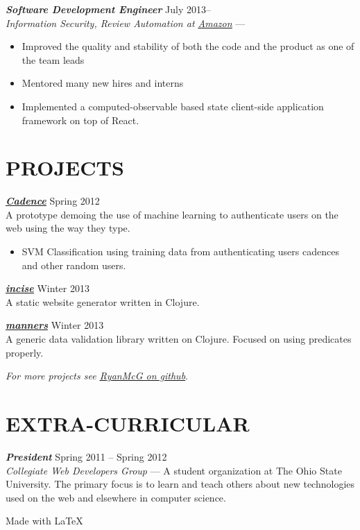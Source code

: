 \documentclass[line,letterpaper]{resume}
\begin{document}
\begin{resume}
    {\sl\textbf{Software Development Engineer}} \hfill July 2013--\\
    \emph{Information Security, Review Automation at
    \underline{\href{http://www.amazon.com/}{Amazon}}} ---
    \begin{itemize}
        \item Improved the quality and stability of both the code and the
            product as one of the team leads
        \item Mentored many new hires and interns
        \item Implemented
            a computed-observable based state client-side application framework on top
            of React.
    \end{itemize}
    \vspace{-6pt}


    \section{\uppercase{Projects}}
    {\sl\textbf{\underline{\href{https://github.com/RyanMcG/Cadence}{Cadence}}}}
    \hfill Spring 2012\\
    A prototype demoing the use of machine learning to authenticate users on the
    web using the way they type.
    \begin{itemize}
        \item SVM Classification using training data from authenticating users
            cadences and other random users.
    \end{itemize}

    \vspace{-6pt}
    {\sl\textbf{\underline{\href{https://github.com/RyanMcG/incise}{incise}}}}
    \hfill Winter 2013\\
    A static website generator written in Clojure.
    \vspace{-6pt}

    {\sl\textbf{\underline{\href{https://github.com/RyanMcG/manners}{manners}}}}
    \hfill Winter 2013\\
    A generic data validation library written on Clojure.
    Focused on using predicates properly.

    \vspace{-6pt}

    \hfill \emph{For more projects see
    \underline{\href{https://github.com/RyanMcG}{RyanMcG on github}}}.

    \vspace{-15pt}

    \section{\uppercase{Extra-Curricular}}
    {\sl\textbf{President}} \hfill Spring 2011 -- Spring 2012\\
    \emph{Collegiate Web Developers Group} --- A student organization at The
    Ohio State University. The primary focus is to learn and teach others about
    new technologies used on the web and elsewhere in computer science.

\end{resume}

\vspace{30pt}

\hfill Made with \LaTeX{}
\end{document}
